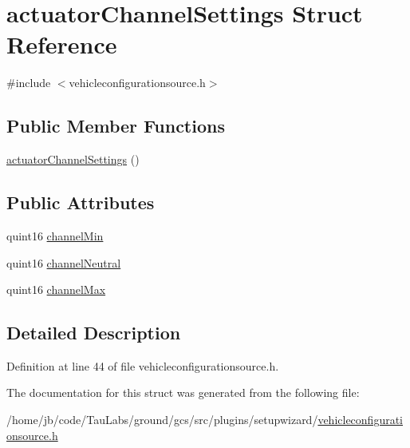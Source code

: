 \hypertarget{structactuator_channel_settings}{\section{actuator\-Channel\-Settings \-Struct \-Reference}
\label{structactuator_channel_settings}
}


{\ttfamily \#include $<$vehicleconfigurationsource.\-h$>$}

\subsection*{\-Public \-Member \-Functions}
\begin{DoxyCompactItemize}
\item 
\hyperlink{group___vehicle_configuration_source_gafb0dd689dc5216c230c118b385dc1b56}{actuator\-Channel\-Settings} ()
\end{DoxyCompactItemize}
\subsection*{\-Public \-Attributes}
\begin{DoxyCompactItemize}
\item 
quint16 \hyperlink{group___vehicle_configuration_source_ga51bfc85e00becd45e4e622da70ff9d27}{channel\-Min}
\item 
quint16 \hyperlink{group___vehicle_configuration_source_gac557d0adca6e1ec8f789659c32cfbeff}{channel\-Neutral}
\item 
quint16 \hyperlink{group___vehicle_configuration_source_ga204a4e4648453d51e42ad2b82cb68fa8}{channel\-Max}
\end{DoxyCompactItemize}


\subsection{\-Detailed \-Description}


\-Definition at line 44 of file vehicleconfigurationsource.\-h.



\-The documentation for this struct was generated from the following file\-:\begin{DoxyCompactItemize}
\item 
/home/jb/code/\-Tau\-Labs/ground/gcs/src/plugins/setupwizard/\hyperlink{vehicleconfigurationsource_8h}{vehicleconfigurationsource.\-h}\end{DoxyCompactItemize}
